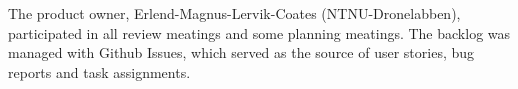 The product owner, Erlend-Magnus-Lervik-Coates (NTNU-Dronelabben), participated in all review meatings and some planning meatings. The backlog was managed with Github Issues, which served as the source of user stories, bug reports and task assignments.






